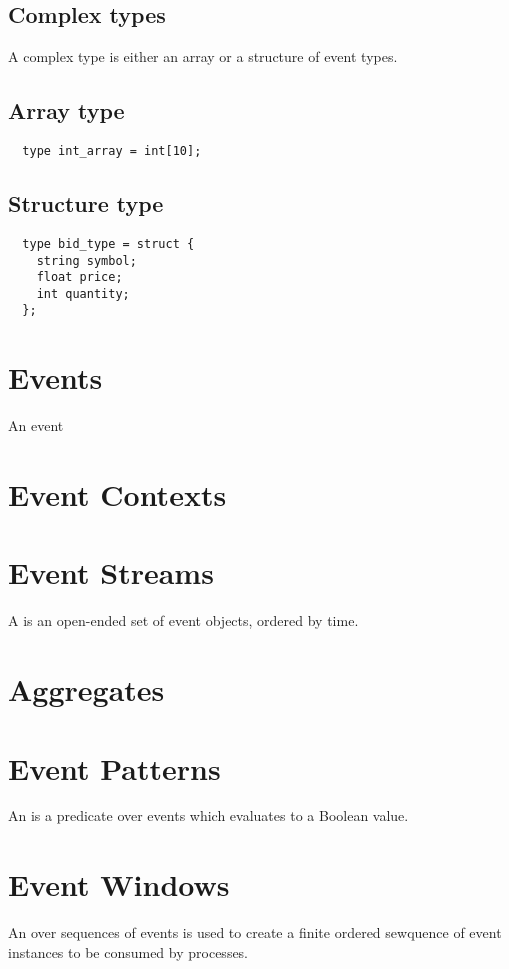 \documentclass[twocolumn]{report}
\begin{document}
\subsection{Complex types}
A complex type is either an array or a structure of event types.

\subsection{Array type}

\begin{verbatim}
  type int_array = int[10];
\end{verbatim}

\subsection{Structure type}

\begin{verbatim}
  type bid_type = struct {
    string symbol;
    float price;
    int quantity;
  };
\end{verbatim}

\section{Events}
An event 

\section{Event Contexts}

\section{Event Streams}
A  is an open-ended set of event objects, ordered by time.

\section{Aggregates}

\section{Event Patterns}
An  is a predicate over events which evaluates to a Boolean
value. 

\section{Event Windows}
An  over sequences of events is used to create a finite
ordered sewquence of event instances to be consumed by processes.
\end{document}
